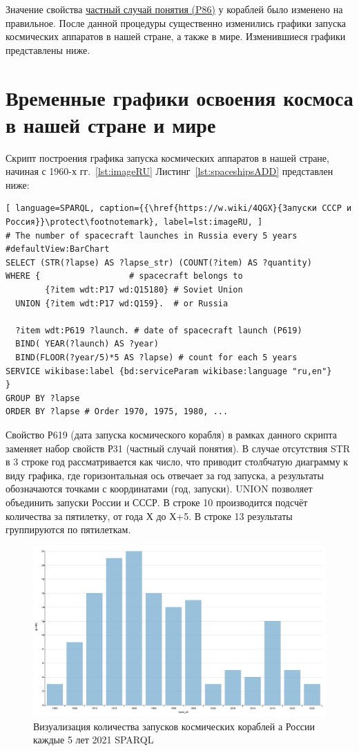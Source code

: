 Значение свойства \href{https://www.wikidata.org/wiki/Property:P86}{частный случай понятия (P86)} у кораблей было изменено на правильное. После данной процедуры существенно изменились графики запуска космических аппаратов в нашей стране, а также в мире. Изменившиеся графики представлены ниже.

\section{Временные графики освоения космоса в нашей стране и мире}
Скрипт построения графика запуска космических аппаратов в нашей стране, начиная с 1960-х гг.~\ref{lst:imageRU}
Листинг~\ref{lst:spaceshipsADD} представлен ниже:
\begin{lstlisting}[ language=SPARQL, caption={{\href{https://w.wiki/4QGX}{Запуски СССР и Россия}}\protect\footnotemark}, label=lst:imageRU, ]
# The number of spacecraft launches in Russia every 5 years
#defaultView:BarChart
SELECT (STR(?lapse) AS ?lapse_str) (COUNT(?item) AS ?quantity)
WHERE {                  # spacecraft belongs to
        {?item wdt:P17 wd:Q15180} # Soviet Union
  UNION {?item wdt:P17 wd:Q159}.  # or Russia
  
  ?item wdt:P619 ?launch. # date of spacecraft launch (P619)
  BIND( YEAR(?launch) AS ?year) 
  BIND(FLOOR(?year/5)*5 AS ?lapse) # count for each 5 years
SERVICE wikibase:label {bd:serviceParam wikibase:language "ru,en"}
} 
GROUP BY ?lapse
ORDER BY ?lapse # Order 1970, 1975, 1980, ...
\end{lstlisting}
Свойство Р619 (дата запуска космического корабля) в рамках данного скрипта заменяет набор свойств Р31 (частный случай понятия). В случае отсутствия STR в 3 строке год рассматривается как число, что приводит столбчатую диаграмму к виду графика, где горизонтальная ось отвечает за год запуска, а результаты обозначаются точками с координатами (год, запуски). UNION позволяет объединить запуски России и СССР. В строке 10 производится подсчёт количества за пятилетку, от года Х до Х+5. В строке 13 результаты группируются по пятилеткам.

\begin{figure}[h!]
  \includegraphics[width=\linewidth]{graphics/chapter/spacecraft_space_station/ImgRU.png}
  \caption[График Россия]{Визуализация количества запусков космических кораблей а России каждые 5 лет 2021 SPARQL}%
  \label{fig:ImageRU5}%
\end{figure}

